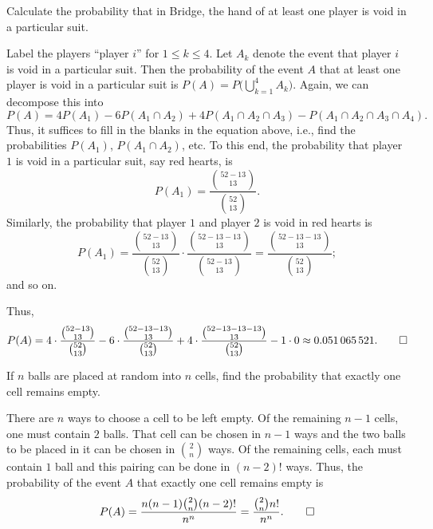 \begin{problem}[Handout 2, \# 7]
  Calculate the probability that in Bridge, the hand of at least one player
  is void in a particular suit.
\end{problem}
\begin{solution*}
  Label the players ``player \(i\)'' for \(1\leq k\leq 4\). Let \(A_k\)
  denote the event that player \(i\) is void in a particular suit. Then
  the probability of the event \(A\) that at least one player is void in a
  particular suit is \(P(A)=P\bigl(\bigcup_{k=1}^4 A_k\bigr)\). Again, we
  can decompose this into
  \[
    P(A)=4P(A_1)-6P(A_1\cap A_2)+4P(A_1\cap A_2\cap A_3)-P(A_1\cap A_2\cap
    A_3\cap A_4).
  \]
  Thus, it suffices to fill in the blanks in the equation above, i.e., find
  the probabilities \(P(A_1)\), \(P(A_1\cap A_2)\), etc. To this end, the
  probability that player \(1\) is void in a particular suit, say red
  hearts, is
  \[
    P(A_1)=\frac{\binom{52-13}{13}}{\binom{52}{13}}.
  \]
  Similarly, the probability that player \(1\) and player \(2\) is void in
  red hearts is
  \[
    P(A_1)=\frac{\binom{52-13}{13}}{\binom{52}{13}}\cdot\frac{\binom{52-13-13}{13}}{\binom{52-13}{13}}=\frac{\binom{52-13-13}{13}}{\binom{52}{13}};
  \]
  and so on.

  Thus,
  \[
    P(A)=4\cdot\frac{\binom{52-13}{13}}{\binom{52}{13}}
    -6\cdot\frac{\binom{52-13-13}{13}}{\binom{52}{13}}
    +4\cdot\frac{\binom{52-13-13-13}{13}}{\binom{52}{13}}
    -1\cdot0\approx \num{0.051065521}.\qedhere
  \]
\end{solution*}

\begin{problem}[Handout 2, \# 12]
  If \(n\) balls are placed at random into \(n\) cells, find the
  probability that exactly one cell remains empty.
\end{problem}
\begin{solution*}
  There are \(n\) ways to choose a cell to be left empty. Of the remaining
  \(n-1\) cells, one must contain \(2\) balls. That cell can be chosen in
  \(n-1\) ways and the two balls to be placed in it can be chosen in
  \(\binom{2}{n}\) ways. Of the remaining cells, each must contain \(1\)
  ball and this pairing can be done in \((n-2)!\) ways. Thus, the
  probability of the event \(A\) that exactly one cell remains empty is
  \[
    P(A)=\frac{n(n-1)\binom{2}{n}(n-2)!}{n^n}=\frac{\binom{2}{n}n!}{n^n}.
    \qedhere
  \]
\end{solution*}

